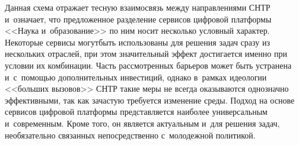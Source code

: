 \begin{multicols}{2}
Данная схема отражает тесную взаимосвязь меж\-ду направлениями СНТР и~означает, 
что предложенное разделение сервисов цифровой платформы
 <<Наука и~образование>> 
по ним носит несколько условный характер. Некоторые сервисы могут\linebreak быть 
использованы для решения задач сразу из нескольких отраслей, при этом значительный 
эффект достигается именно при условии их комбинации. Часть рассмотренных барьеров 
может быть устранена и~с~по\-мощью дополнительных инвестиций, однако в~рамках 
идеологии <<больших вызовов>> СНТР такие меры не всегда оказываются однозначно 
эффективными, так как зачастую требуется изменение среды. Подход на основе сервисов 
цифровой платформы представляется наиболее универсальным и~современным. 
Кроме того, он является актуальным и~для решения задач, необязательно 
связанных непосредственно с~молодежной по\-ли\-тикой.

{\small\frenchspacing
 {%
 \begin{thebibliography}{99}


\end{thebibliography}}}
\end{multicols}
